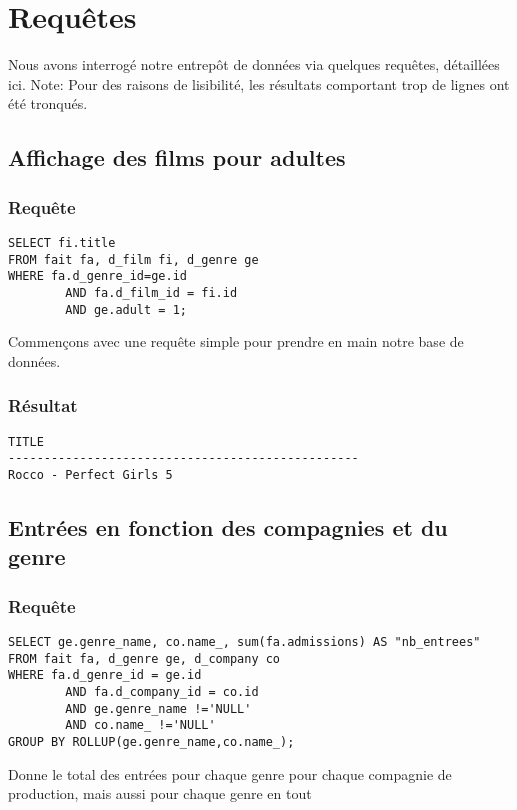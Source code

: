 \section{Requêtes}

Nous avons interrogé notre entrepôt de données via quelques requêtes, détaillées ici.
Note: Pour des raisons de lisibilité, les résultats comportant trop de lignes ont été tronqués.

\subsection{Affichage des films pour adultes}
\subsubsection{Requête}
\begin{lstlisting}
SELECT fi.title
FROM fait fa, d_film fi, d_genre ge
WHERE fa.d_genre_id=ge.id
		AND fa.d_film_id = fi.id
		AND ge.adult = 1;
\end{lstlisting}
Commençons avec une requête simple pour prendre en main notre base de données.
\subsubsection{Résultat}
\begin{lstlisting}
TITLE
-------------------------------------------------
Rocco - Perfect Girls 5
\end{lstlisting}

\subsection{Entrées en fonction des compagnies et du genre}
\subsubsection{Requête}
\begin{lstlisting}
SELECT ge.genre_name, co.name_, sum(fa.admissions) AS "nb_entrees"
FROM fait fa, d_genre ge, d_company co
WHERE fa.d_genre_id = ge.id
		AND fa.d_company_id = co.id
		AND ge.genre_name !='NULL'
		AND co.name_ !='NULL'
GROUP BY ROLLUP(ge.genre_name,co.name_);
\end{lstlisting}
Donne le total des entrées pour chaque genre pour chaque compagnie de production, mais aussi pour chaque genre en tout
